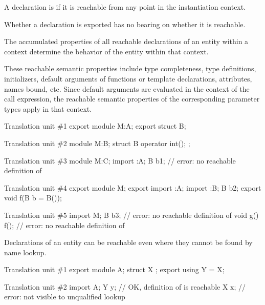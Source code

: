 \pnum
A declaration is 
if it is reachable from
any point in the instantiation context.
\begin{note}
Whether a declaration is exported has no bearing on whether it is reachable.
\end{note}

\pnum
The accumulated properties of all reachable declarations of
an entity within a context
determine the behavior of the entity within that context.
\begin{note}
These reachable semantic properties include type completeness,
type definitions, initializers,
default arguments of functions or template declarations, attributes,
names bound, etc.
Since default arguments are evaluated in the context of the call expression,
the reachable semantic properties of the corresponding parameter types apply in
that context.
\begin{example}
\begin{codeblocktu}{Translation unit \#1}
export module M:A;
export struct B;
\end{codeblocktu}

\begin{codeblocktu}{Translation unit \#2}
module M:B;
struct B {
  operator int();
};
\end{codeblocktu}

\begin{codeblocktu}{Translation unit \#3}
module M:C;
import :A;
B b1;                           // error: no reachable definition of 
\end{codeblocktu}

\begin{codeblocktu}{Translation unit \#4}
export module M;
export import :A;
import :B;
B b2;
export void f(B b = B());
\end{codeblocktu}

\begin{codeblocktu}{Translation unit \#5}
import M;
B b3;                           // error: no reachable definition of 
void g() { f(); }               // error: no reachable definition of 
\end{codeblocktu}
\end{example}
\end{note}

\pnum
\begin{note}
Declarations of an entity can be reachable
even where they cannot be found by name lookup.
\end{note}
\begin{example}
\begin{codeblocktu}{Translation unit \#1}
export module A;
struct X {};
export using Y = X;
\end{codeblocktu}

\begin{codeblocktu}{Translation unit \#2}
import A;
Y y;                // OK, definition of  is reachable
X x;                // error:  not visible to unqualified lookup
\end{codeblocktu}
\end{example}
